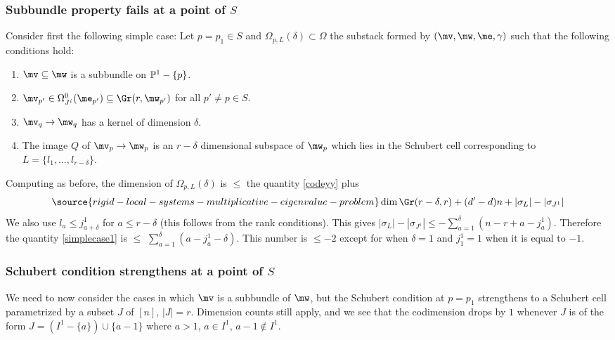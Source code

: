 \subsubsection{Subbundle property fails at a point of $S$}\label{bruck02}
Consider first the following simple case: Let $p=p_1\in S$ and $\Omega_{p,L}(\delta)\subset \Omega$ the substack formed by
$(\mv,\mw,\me,\gamma)$ such that the following conditions hold:
\begin{enumerate}
\item[(a)] $\mv\subseteq \mw$ is a subbundle on $\Bbb{P}^1-\{p\}$.
\item[(b)]   $\mv_{p'}\in \Omega^0_{J^i}(\me_{p'})\subseteq \Gr(r,\mw_{p'})$ for all $p'\neq p\in S$.
\item[(c)] $\mv_q\to\mw_q$ has a kernel of dimension $\delta$.
\item[(d)] The image $Q$ of $\mv_p\to\mw_p$ is an $r-\delta$ dimensional subspace of $\mw_p$ which lies in the Schubert cell  corresponding to $L=\{l_1,\dots,l_{r-\delta}\}$.
\end{enumerate}

Computing as before, the dimension of  $\Omega_{p,L}(\delta)$ is $\leq$ the quantity \eqref{codeyy} plus
\begin{equation}\label{simplecase1}
\source{rigid-local-systems-multiplicative-eigenvalue-problem}
\dim \Gr(r-\delta,r)+ (d'-d)n + |\sigma_L|-|\sigma_{J^1}|
\end{equation}
We also use $l_a\leq j^1_{a+\delta}$ for $a\leq r-\delta$ (this follows from the rank conditions).  This gives  $|\sigma_L|-|\sigma_{J^1}|\leq -\sum_{a=1}^{\delta} (n-r+a-j^1_a)$. Therefore the quantity \eqref{simplecase1} is $\leq$
$\sum_{a=1}^{\delta} (a-j^1_a-\delta)$. This number is $\leq -2$ except for when $\delta=1$ and $j^1_1=1$ when it is equal to $-1$.

\subsubsection{Schubert condition strengthens at a point of $S$}\label{bruck03}
We need to now consider the cases in which $\mv$ is a subbundle of $\mw$, but the Schubert condition at $p=p_1$ strengthens to a Schubert cell parametrized by a subset $J$ of $[n]$, $|J|=r$. Dimension counts still apply, and we see that the codimension drops by $1$ whenever $J$ is of the form $J=(I^1-\{a\})\cup \{a-1\}$ where $a>1$, $a\in I^1$, $a-1\not\in I^1$.
